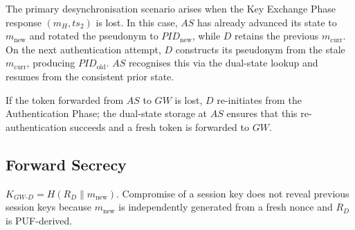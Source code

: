 The primary desynchronisation scenario arises when the Key Exchange Phase response
$(m_H, ts_2)$ is lost.
In this case, $AS$ has already advanced its state to $m_{\mathrm{new}}$ and rotated
the pseudonym to $\mathit{PID}_{\mathrm{new}}$, while $D$ retains the previous
$m_{\mathrm{curr}}$.
On the next authentication attempt, $D$ constructs its pseudonym from the stale
$m_{\mathrm{curr}}$, producing $\mathit{PID}_{\mathrm{old}}$.
$AS$ recognises this via the dual-state lookup and resumes from the consistent prior
state.

If the token forwarded from $AS$ to $GW$ is lost, $D$ re-initiates from the
Authentication Phase; the dual-state storage at $AS$ ensures that this
re-authentication succeeds and a fresh token is forwarded to $GW$.

\enlargethispage{3\baselineskip}
\vspace{-6pt}
\subsection{Forward Secrecy}

$K_{GW\text{-}D} = H(R_D \| m_{\mathrm{new}})$.
Compromise of a session key does not reveal previous session keys because
$m_{\mathrm{new}}$ is independently generated from a fresh nonce and $R_D$ is
PUF-derived.
